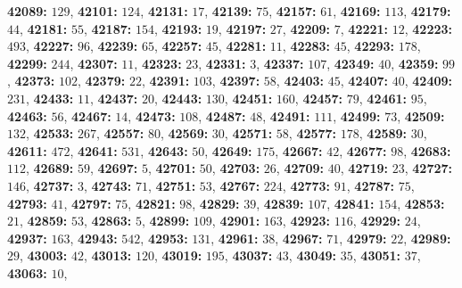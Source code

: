\textsf{\bfseries 42089:} $129$, \textsf{\bfseries 42101:} $124$, \textsf{\bfseries 42131:} $17$, \textsf{\bfseries 42139:} $75$, \textsf{\bfseries 42157:} $61$, \textsf{\bfseries 42169:} $113$, \textsf{\bfseries 42179:} $44$, \textsf{\bfseries 42181:} $55$, \textsf{\bfseries 42187:} $154$, \textsf{\bfseries 42193:} $19$, \textsf{\bfseries 42197:} $27$, \textsf{\bfseries 42209:} $7$, \textsf{\bfseries 42221:} $12$, \textsf{\bfseries 42223:} $493$, \textsf{\bfseries 42227:} $96$, \textsf{\bfseries 42239:} $65$, \textsf{\bfseries 42257:} $45$, \textsf{\bfseries 42281:} $11$, \textsf{\bfseries 42283:} $45$, \textsf{\bfseries 42293:} $178$, \textsf{\bfseries 42299:} $244$, \textsf{\bfseries 42307:} $11$, \textsf{\bfseries 42323:} $23$, \textsf{\bfseries 42331:} $3$, \textsf{\bfseries 42337:} $107$, \textsf{\bfseries 42349:} $40$, \textsf{\bfseries 42359:} $99$, \textsf{\bfseries 42373:} $102$, \textsf{\bfseries 42379:} $22$, \textsf{\bfseries 42391:} $103$, \textsf{\bfseries 42397:} $58$, \textsf{\bfseries 42403:} $45$, \textsf{\bfseries 42407:} $40$, \textsf{\bfseries 42409:} $231$, \textsf{\bfseries 42433:} $11$, \textsf{\bfseries 42437:} $20$, \textsf{\bfseries 42443:} $130$, \textsf{\bfseries 42451:} $160$, \textsf{\bfseries 42457:} $79$, \textsf{\bfseries 42461:} $95$, \textsf{\bfseries 42463:} $56$, \textsf{\bfseries 42467:} $14$, \textsf{\bfseries 42473:} $108$, \textsf{\bfseries 42487:} $48$, \textsf{\bfseries 42491:} $111$, \textsf{\bfseries 42499:} $73$, \textsf{\bfseries 42509:} $132$, \textsf{\bfseries 42533:} $267$, \textsf{\bfseries 42557:} $80$, \textsf{\bfseries 42569:} $30$, \textsf{\bfseries 42571:} $58$, \textsf{\bfseries 42577:} $178$, \textsf{\bfseries 42589:} $30$, \textsf{\bfseries 42611:} $472$, \textsf{\bfseries 42641:} $531$, \textsf{\bfseries 42643:} $50$, \textsf{\bfseries 42649:} $175$, \textsf{\bfseries 42667:} $42$, \textsf{\bfseries 42677:} $98$, \textsf{\bfseries 42683:} $112$, \textsf{\bfseries 42689:} $59$, \textsf{\bfseries 42697:} $5$, \textsf{\bfseries 42701:} $50$, \textsf{\bfseries 42703:} $26$, \textsf{\bfseries 42709:} $40$, \textsf{\bfseries 42719:} $23$, \textsf{\bfseries 42727:} $146$, \textsf{\bfseries 42737:} $3$, \textsf{\bfseries 42743:} $71$, \textsf{\bfseries 42751:} $53$, \textsf{\bfseries 42767:} $224$, \textsf{\bfseries 42773:} $91$, \textsf{\bfseries 42787:} $75$, \textsf{\bfseries 42793:} $41$, \textsf{\bfseries 42797:} $75$, \textsf{\bfseries 42821:} $98$, \textsf{\bfseries 42829:} $39$, \textsf{\bfseries 42839:} $107$, \textsf{\bfseries 42841:} $154$, \textsf{\bfseries 42853:} $21$, \textsf{\bfseries 42859:} $53$, \textsf{\bfseries 42863:} $5$, \textsf{\bfseries 42899:} $109$, \textsf{\bfseries 42901:} $163$, \textsf{\bfseries 42923:} $116$, \textsf{\bfseries 42929:} $24$, \textsf{\bfseries 42937:} $163$, \textsf{\bfseries 42943:} $542$, \textsf{\bfseries 42953:} $131$, \textsf{\bfseries 42961:} $38$, \textsf{\bfseries 42967:} $71$, \textsf{\bfseries 42979:} $22$, \textsf{\bfseries 42989:} $29$, \textsf{\bfseries 43003:} $42$, \textsf{\bfseries 43013:} $120$, \textsf{\bfseries 43019:} $195$, \textsf{\bfseries 43037:} $43$, \textsf{\bfseries 43049:} $35$, \textsf{\bfseries 43051:} $37$, \textsf{\bfseries 43063:} $10$, 
